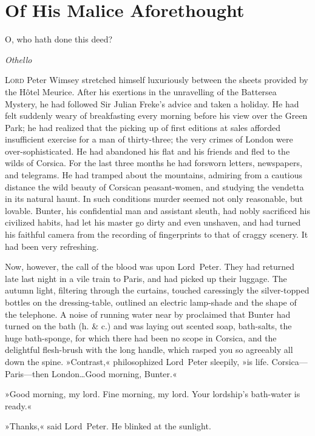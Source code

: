 


\chapter{Of His Malice Aforethought}

\epigraph{O, who hath done this deed?}{\textit{Othello}}


\lettrine[lines=4]{L}{ord} Peter Wimsey stretched himself luxuriously be\-tween the sheets provided by the Hôtel Meurice. After his exertions in the unravelling of the Battersea Mystery, he had followed Sir Julian Freke's advice and taken a holiday. He had felt suddenly weary of breakfasting every morning before his view over the Green Park; he had realized that the picking up of first editions at sales afforded insufficient exercise for a man of thirty-three; the very crimes of London were over-sophisticated. He had abandoned his flat and his friends and fled to the wilds of Corsica. For the last three months he had forsworn letters, newspapers, and telegrams. He had tramped about the mountains, admiring from a cautious distance the wild beauty of Corsican peasant-women, and studying the vendetta in its natural haunt. In such conditions murder seemed not only reasonable, but lovable. Bunter, his confidential man and assistant sleuth, had nobly sacrificed his civilized habits, had let his master go dirty and even unshaven, and had turned his faithful camera from the recording of fingerprints to that of craggy scenery. It had been very refreshing.

Now, however, the call of the blood was upon Lord~Peter. They had returned late last night in a vile train to Paris, and had picked up their luggage. The autumn light, filtering through the curtains, touched caressingly the silver-topped bottles on the dressing-table, outlined an electric lamp-shade and the shape of the telephone. A noise of running water near by proclaimed that Bunter had turned on the bath (h. \& c.) and was laying out scented soap, bath-salts, the huge bath-sponge, for which there had been no scope in Corsica, and the delightful flesh-brush with the long handle, which rasped you so agreeably all down the spine. »Contrast,« philosophized Lord~Peter sleepily, »is life. Corsica—Paris—then London\dots Good morning, Bunter.«

»Good morning, my lord. Fine morning, my lord. Your lordship's bath-water is ready.«

»Thanks,« said Lord~Peter. He blinked at the sunlight.

